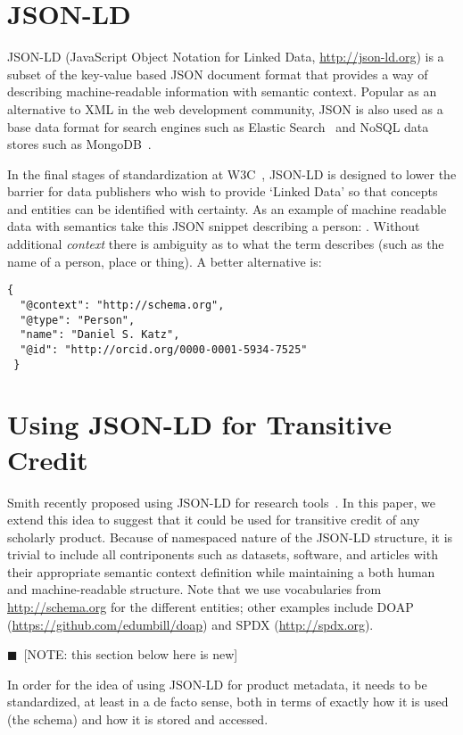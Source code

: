 \documentclass[a4paper,10pt]{article}
\newcommand{\note}[1]{{\color{darkgreen}$\blacksquare$~\textsf{[NOTE: #1]}}}
\begin{document}
\section{JSON-LD}


JSON-LD (JavaScript Object Notation for Linked Data, \url{http://json-ld.org}) is a subset of the key-value based JSON document format that provides a way of describing machine-readable information with semantic context. Popular as an alternative to XML in the web development community, JSON is also used as a base data format for search engines such as Elastic Search~\cite{elasticsearch} and NoSQL data stores such as MongoDB~\cite{mongodb}.

In the final stages of standardization at W3C~\cite{w3c}, JSON-LD is designed to lower the barrier for data publishers who wish to provide `Linked Data' so that concepts and entities can be identified with certainty. As an example of machine readable data with semantics take this JSON snippet describing a person: \jsonexample . Without additional \textit{context} there is ambiguity as to what the \name term describes (such as the name of a person, place or thing). A better alternative is:

{\footnotesize
\begin{verbatim}
{
  "@context": "http://schema.org",
  "@type": "Person",
  "name": "Daniel S. Katz",
  "@id": "http://orcid.org/0000-0001-5934-7525"
 }
\end{verbatim}
}


\section{Using JSON-LD for Transitive Credit}

Smith recently proposed using JSON-LD for research tools~\cite{arfon-json-ld-blog}. In this paper, we extend this idea to suggest that it could be used for transitive credit of any scholarly product. Because of namespaced nature of the JSON-LD structure, it is trivial to include all contriponents such as datasets, software, and articles with their appropriate semantic context definition while maintaining a both human and machine-readable structure. Note that we use vocabularies from \url{http://schema.org} for the different entities; other examples include DOAP (\url{https://github.com/edumbill/doap}) and SPDX (\url{http://spdx.org}).

\note{this section below here is new}

In order for the idea of using JSON-LD for product metadata, it needs to be standardized, at least in a de facto sense, both in terms of exactly how it is used (the schema) and how it is stored and accessed.
\end{document}

